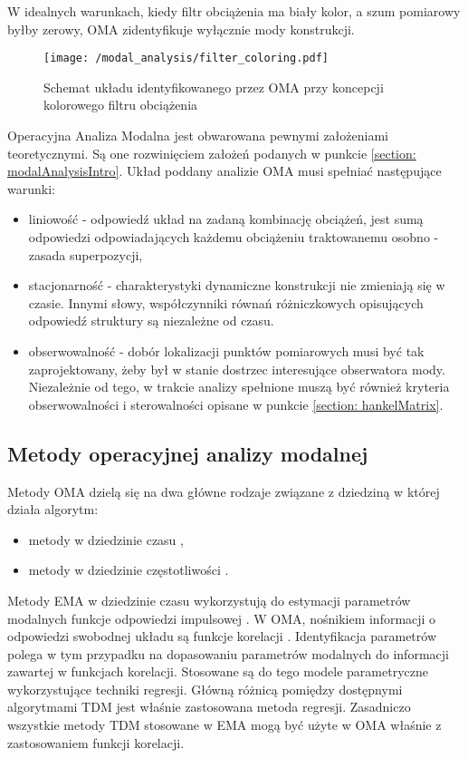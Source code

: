 W idealnych warunkach, kiedy filtr obciążenia ma biały kolor, a szum pomiarowy byłby zerowy, OMA zidentyfikuje wyłącznie mody konstrukcji.
\begin{figure}[hbt!] 
	\centering
	\texttt{[image: /modal\_analysis/filter\_coloring.pdf]}
	\captionsetup{justification=centering}
	\caption{Schemat układu identyfikowanego przez OMA przy koncepcji kolorowego filtru obciążenia}
	\label{fig: color_filter_oma}
\end{figure}

Operacyjna Analiza Modalna jest obwarowana pewnymi założeniami teoretycznymi. Są one rozwinięciem założeń podanych w punkcie \ref{section: modalAnalysisIntro}. Układ poddany analizie OMA musi spełniać następujące warunki:
\begin{itemize}
	\item liniowość - odpowiedź układ na zadaną kombinację obciążeń, jest sumą odpowiedzi odpowiadających każdemu obciążeniu traktowanemu osobno - zasada superpozycji,
	\item stacjonarność - charakterystyki dynamiczne konstrukcji nie zmieniają się w czasie. Innymi słowy, współczynniki równań różniczkowych opisujących odpowiedź struktury są niezależne od czasu.
	\item obserwowalność - dobór lokalizacji punktów pomiarowych musi być tak zaprojektowany, żeby był w stanie dostrzec interesujące obserwatora mody. Niezależnie od tego, w trakcie analizy spełnione muszą być również kryteria obserwowalności i sterowalności opisane w punkcie \ref{section: hankelMatrix}.
\end{itemize}


\subsection{Metody operacyjnej analizy modalnej}

Metody OMA dzielą się na dwa główne rodzaje związane z dziedziną w której działa algorytm:
\begin{itemize}
	\item metody w dziedzinie czasu ,
	\item metody w dziedzinie częstotliwości .
\end{itemize}
Metody EMA w dziedzinie czasu wykorzystują do estymacji parametrów modalnych funkcje odpowiedzi impulsowej . W OMA, nośnikiem informacji o odpowiedzi swobodnej układu  są funkcje korelacji . Identyfikacja parametrów polega w tym przypadku na dopasowaniu parametrów modalnych do informacji zawartej w funkcjach korelacji. Stosowane są do tego modele parametryczne wykorzystujące techniki regresji. Główną różnicą pomiędzy dostępnymi algorytmami TDM jest właśnie zastosowana metoda regresji. Zasadniczo wszystkie metody TDM stosowane w EMA mogą być użyte w OMA właśnie z zastosowaniem funkcji korelacji. 

